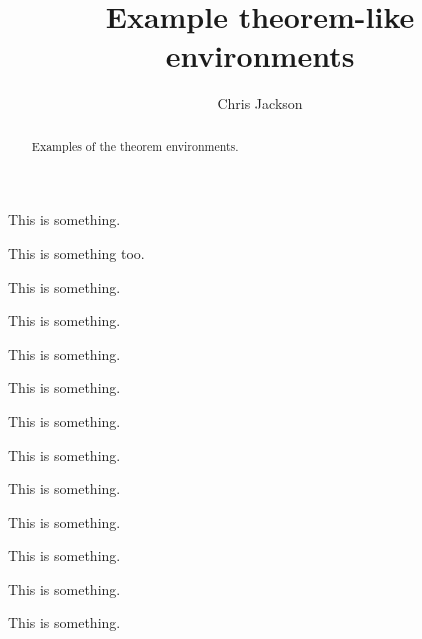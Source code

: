 \documentclass{ximera}
\author{Chris Jackson}
\title[Pretitle:]{Example theorem-like environments}
\begin{document}
\begin{abstract}
  Examples of the theorem environments.
\end{abstract}
\maketitle

\begin{theorem}
  This is something.
\end{theorem}

\begin{theorem}[My theorem]
  This is something too.
\end{theorem}

\begin{algorithm}
  This is something.
\end{algorithm}

\begin{axiom}
  This is something.
\end{axiom}

\begin{claim}
  This is something.
\end{claim}

\begin{conclusion}
  This is something.
\end{conclusion}

\begin{condition}
  This is something.
\end{condition}

\begin{conjecture}
  This is something.
\end{conjecture}

\begin{corollary}
  This is something.
\end{corollary}

\begin{criterion}
  This is something.
\end{criterion}

\begin{definition}
  This is something.
\end{definition}

\begin{example}
  This is something.
\end{example}

\begin{explanation}
  This is something.
\end{explanation}
\end{document}
